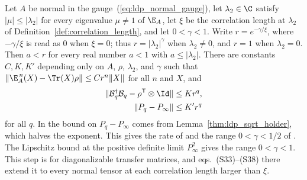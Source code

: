 \begin{lemma}
    \label{thm:ldp_positive_part_rate}
    \leanok
    Let $A$ be normal in the gauge~(\ref{eq:ldp_normal_gauge}), let
    $\lambda_2\in\C$ satisfy $\lvert\mu\rvert\le\lvert\lambda_2\rvert$ for every
    eigenvalue $\mu\ne1$ of $\E_A$, let $\xi$ be the correlation length at
    $\lambda_2$ of Definition~\ref{def:correlation_length}, and let
    $0<\gamma<1$. Write $r=e^{-\gamma/\xi}$, where $-\gamma/\xi$ is read as $0$
    when $\xi=0$; thus $r=\lvert\lambda_2\rvert^{\gamma}$ when $\lambda_2\ne0$,
    and $r=1$ when $\lambda_2=0$. Then $a<r$ for every real number $a<1$ with
    $a\le\lvert\lambda_2\rvert$. There are constants $C,K,K'$ depending only
    on $A$, $\rho$, $\lambda_2$, and $\gamma$ such that
    $\lVert\E_A^{\,n}(X)-\Tr(X)\rho\rVert\le Cr^n\lVert X\rVert$
    for all $n$ and $X$, and
    \begin{align*}
        \lVert\mathcal B_q^\dagger\mathcal B_q-\rho^{\mathsf T}\otimes\Id\rVert
         & \le Kr^q, \\
        \lVert P_q-P_\infty\rVert
         & \le K'r^q
    \end{align*}
    for all $q$.
    In \cite[Supplemental Material, eq.~(26)]{Piroli2021LOCC} the bound on
    $P_q-P_\infty$ comes from Lemma~\ref{thm:ldp_sqrt_holder}, which halves
    the exponent. This gives the rate of
    \cite[eq.~(34)]{Piroli2021LOCC} and the range $0<\gamma<1/2$ of
    \cite[Lemma~1 and eq.~(S9)]{Malz2024Preparation}. The Lipschitz bound at
    the positive definite limit $P_\infty^2$ gives the range $0<\gamma<1$.
    This step is \cite[App.~B3, eqs.~(S27)--(S32)]{Murota2026ExactLogDepth}
    for diagonalizable transfer matrices, and eqs.~(S33)--(S38) there extend
    it to every normal tensor at each correlation length larger than $\xi$.
\end{lemma}
